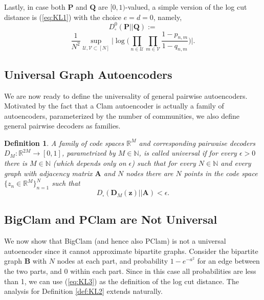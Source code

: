 \documentclass[letterpaper]{article} %
\newtheorem{definition}[theorem]{Definition}
\begin{document}
Lastly, in case both $\mathbf{P}$ and $\mathbf{Q}$ are $[0,1)$-valued, a simple version of the log cut distance is (\ref{eq:KL1}) with the choice $e=d=0$, namely,
 \[D^0_{\square}(\mathbf{P} || \mathbf{Q}):=\]
 \begin{equation}
    \label{eq:KL3}
         \frac{1}{N^2}\sup_{\mathcal{U},\mathcal{V}\subset[N]}\Big|\log\Big(\prod_{n\in \mathcal{U}}\prod_{m\in \mathcal{V}}
\frac{1-p_{n,m}}{1-q_{n,m}}\Big)\Big|.
    \end{equation}



\subsection{Universal Graph Autoencoders}

We are now ready to define the universality of general pairwise autoencoders. Motivated by the fact that a Clam autoencoder is actually a family of autoencoders, parameterized by the number of communities, we also define general pairwise decoders as families.

\begin{definition}
    A family of code spaces $\mathbb{R}^M$ and corresponding pairwaise decoders $D_M:\mathbb{R}^{2M}\rightarrow[0,1]$, parametrized by $M\in\mathbb{N}$, is called  \emph{universal} if for every $\epsilon>0$ there is $M\in\mathbb{N}$ (which depends only on $\epsilon$) such that for every $N\in\mathbb{N}$ and every graph  with adjacency matrix $\mathbf{A}$ and $N$ nodes there are $N$ points in the code space $\{z_n\in\mathbb{R}^M\}_{n=1}^N$ such that 
     \[D_{\square}(\mathbf{D}_M(\mathbf{z}) || \mathbf{A}) <\epsilon.\] 
\end{definition}

\subsection{BigClam and PClam are Not Universal}
\label{BigClam is Not Universal}

We now show that BigClam (and hence also PClam) is not a universal autoencoder since it cannot approximate bipartite graphs.
Consider the bipartite graph $\mathbf{B}$ with $N$ nodes at each part, and probability $1-e^{-a^2}$ for an edge between the two parts, and $0$ within each part. 
Since in this case all probabilities are less than 1, we can use (\ref{eq:KL3}) as the definition of the log cut distance. The analysis for Definition \ref{def:KL2} extends naturally.
\end{document}
